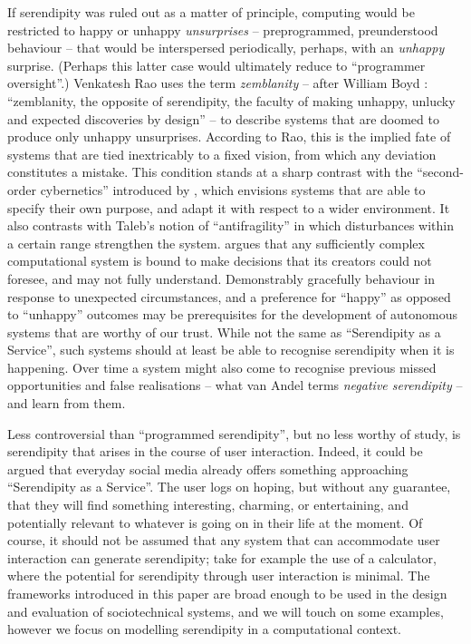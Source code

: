 If serendipity was ruled out as a matter of principle, computing would
be restricted to happy or unhappy \emph{unsurprises} -- preprogrammed,
preunderstood behaviour -- that would be interspersed periodically,
perhaps, with an \emph{unhappy} surprise.  (Perhaps this latter case
would ultimately reduce to ``programmer oversight''.)  Venkatesh Rao
\citeyearpar{rao2015breaking} uses the term \emph{zemblanity} -- after
William Boyd \citeyearpar{boyd2010armadillo}: ``zemblanity, the
opposite of serendipity, the faculty of making unhappy, unlucky and
expected discoveries by design'' -- to describe systems that are
doomed to produce only unhappy unsurprises.  According to Rao, this is
the implied fate of systems that are tied inextricably to a fixed
vision, from which any deviation constitutes a mistake.  This condition
stands at a sharp contrast with the ``second-order cybernetics''
introduced by , which envisions systems that
are able to specify their own purpose, and adapt it with respect to a
wider environment.  It also contrasts with Taleb's
\citeyearpar{taleb2012antifragile} notion of ``antifragility'' in
which disturbances within a certain range strengthen the system.
 argues that any sufficiently complex
computational system is bound to make decisions that its creators
could not foresee, and may not fully understand.  Demonstrably
gracefully behaviour in response to unexpected circumstances, and a
preference for ``happy'' as opposed to ``unhappy'' outcomes may be
prerequisites for the development of autonomous systems that are
worthy of our trust.  While not the same as ``Serendipity as a
Service'', such systems should at least be able to recognise
serendipity when it is happening.  Over time a system might also come
to recognise previous missed opportunities and false realisations --
what van Andel \citeyearpar[p.~639]{van1994anatomy} terms \emph{negative
  serendipity} -- and learn from them.

Less controversial than ``programmed serendipity'', but no less worthy
of study, is serendipity that arises in the course of user
interaction.  Indeed, it could be argued that everyday social media
already offers something approaching ``Serendipity as a Service''.
The user logs on hoping, but without any guarantee, that they will
find something interesting, charming, or entertaining, and potentially
relevant to whatever is going on in their life at the moment.
Of course, it should not be assumed that any system that can accommodate
user interaction can generate serendipity; take for example the use of
a calculator, where the potential for serendipity through user
interaction is minimal.  The frameworks introduced in this paper are
broad enough to be used in the design and evaluation of sociotechnical
systems, and we will touch on some examples, however we focus on
modelling serendipity in a computational context.

